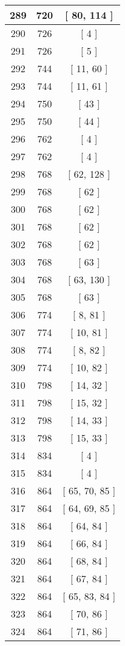 \begin{center}
\begin{longtable}[H]{|| c c c ||}
\hline
289 & 720 & [ 80, 114 ] \\ 
\hline
290 & 726 & [ 4 ] \\ 
\hline
291 & 726 & [ 5 ] \\ 
\hline
292 & 744 & [ 11, 60 ] \\ 
\hline
293 & 744 & [ 11, 61 ] \\ 
\hline
294 & 750 & [ 43 ] \\ 
\hline
295 & 750 & [ 44 ] \\ 
\hline
296 & 762 & [ 4 ] \\ 
\hline
297 & 762 & [ 4 ] \\ 
\hline
298 & 768 & [ 62, 128 ] \\ 
\hline
299 & 768 & [ 62 ] \\ 
\hline
300 & 768 & [ 62 ] \\ 
\hline
301 & 768 & [ 62 ] \\ 
\hline
302 & 768 & [ 62 ] \\ 
\hline
303 & 768 & [ 63 ] \\ 
\hline
304 & 768 & [ 63, 130 ] \\ 
\hline
305 & 768 & [ 63 ] \\ 
\hline
306 & 774 & [ 8, 81 ] \\ 
\hline
307 & 774 & [ 10, 81 ] \\ 
\hline
308 & 774 & [ 8, 82 ] \\ 
\hline
309 & 774 & [ 10, 82 ] \\ 
\hline
310 & 798 & [ 14, 32 ] \\ 
\hline
311 & 798 & [ 15, 32 ] \\ 
\hline
312 & 798 & [ 14, 33 ] \\ 
\hline
313 & 798 & [ 15, 33 ] \\ 
\hline
314 & 834 & [ 4 ] \\ 
\hline
315 & 834 & [ 4 ] \\ 
\hline
316 & 864 & [ 65, 70, 85 ] \\ 
\hline
317 & 864 & [ 64, 69, 85 ] \\ 
\hline
318 & 864 & [ 64, 84 ] \\ 
\hline
319 & 864 & [ 66, 84 ] \\ 
\hline
320 & 864 & [ 68, 84 ] \\ 
\hline
321 & 864 & [ 67, 84 ] \\ 
\hline
322 & 864 & [ 65, 83, 84 ] \\ 
\hline
323 & 864 & [ 70, 86 ] \\ 
\hline
324 & 864 & [ 71, 86 ] \\ 

\end{longtable}
\end{center}

